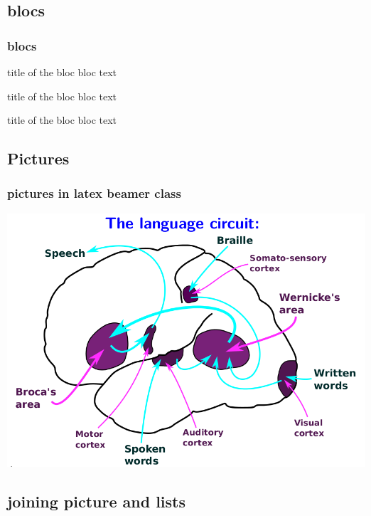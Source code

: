 \documentclass{beamer}
\begin{document}
\subsection{blocs}
\begin{frame}\frametitle{blocs}

\begin{block}{title of the bloc}
bloc text
\end{block}

\begin{exampleblock}{title of the bloc}
bloc text
\end{exampleblock}


\begin{alertblock}{title of the bloc}
bloc text
\end{alertblock}
\end{frame}

\subsection{Pictures} 
\begin{frame}\frametitle{pictures in latex beamer class}
  \centering
\includegraphics[scale=.32]{howbrainworks0} 
\end{frame}

\subsection{joining picture and lists} 
\end{document}
